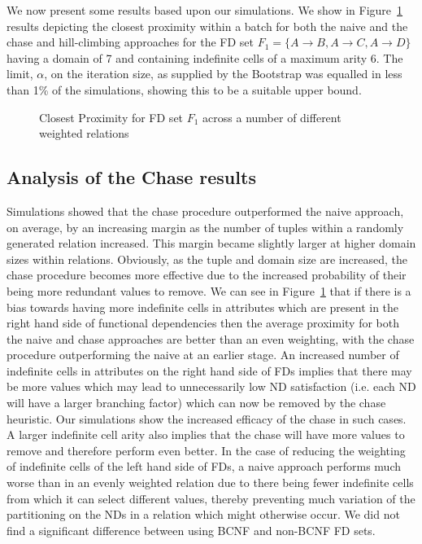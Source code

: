 We now present some results based upon our simulations. We show
in Figure~\ref{graph:4.1} results depicting the closest proximity
within a batch for 
both the naive and the chase and hill-climbing approaches for the
FD set $F_1 = \{A \to B, A \to C, A \to D \}$ having a domain of 7 and 
containing indefinite cells of a maximum arity 6.  The limit, $\alpha$,  
on the iteration size, as supplied by the Bootstrap was 
equalled in less than 1\% of the simulations, showing this to
be a suitable upper bound.

\begin{figure}
\centerline{}
\caption{\label{graph:4.1}\scriptsize{Closest Proximity for FD set $F_1$ across a number of different weighted relations}}
\end{figure}

\smallskip

\subsection{Analysis of the Chase results}

Simulations showed that the chase 
procedure outperformed
the naive approach, on average, by an increasing margin as the number of
tuples within a randomly generated relation increased. This margin became
slightly larger at higher domain sizes within relations. Obviously, as the
tuple and domain size are increased, the chase procedure becomes more 
effective due to the increased probability of their being more redundant 
values to remove. We can see in Figure~\ref{graph:4.1}
that if there is a bias towards having more indefinite cells in attributes
which are present in the right hand side of functional dependencies then
the average proximity for both the naive and chase approaches are better
than an even weighting, with the chase procedure outperforming the naive
at an earlier stage. An increased number of indefinite cells in attributes
on the right hand side of FDs implies that there may be more values which
may lead to unnecessarily low ND satisfaction (i.e. each ND will have a 
larger branching factor) which can now be removed by the chase heuristic.
Our simulations show the increased efficacy of the chase in such cases.
A larger indefinite cell arity also implies that the chase will have more
values to remove and therefore perform even better. In the case of reducing
the weighting of indefinite cells of the left hand side of FDs, a naive
approach performs much worse than in an evenly weighted relation due to
there being fewer indefinite cells from which it can select different
values, thereby preventing much variation of the partitioning on the NDs 
in a relation which might otherwise occur. We did not find a
significant difference between using BCNF and non-BCNF FD sets.

